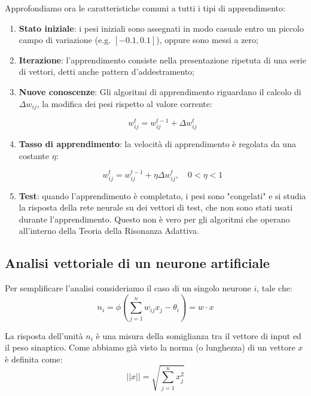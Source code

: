 Approfondiamo ora le caratteristiche comuni a tutti i tipi di apprendimento:
\begin{enumerate}
	\item \textbf{Stato iniziale}: i pesi iniziali sono assegnati in modo
	      casuale entro un piccolo campo di variazione (e.g. $[-0.1, 0.1]$),
	      oppure sono messi a zero;

	\item \textbf{Iterazione}: l'apprendimento consiste nella presentazione
	      ripetuta di una serie di vettori, detti anche pattern d'addestramento;

	\item \textbf{Nuove conoscenze}: Gli algoritmi di apprendimento
	      riguardano il calcolo di $\Delta w_{ij}$, la modifica dei pesi
	      rispetto al valore corrente:

	      \begin{equation*}
		      w_{ij}^t = w_{ij}^{t-1} + \Delta w_{ij}^{t}
	      \end{equation*}

	\item \textbf{Tasso di apprendimento}: la velocità di apprendimento è
	      regolata da una costante $\eta$:

	      \begin{equation*}
		      w_{ij}^t = w_{ij}^{t-1} + \eta \Delta w_{ij}^{t}, \quad 0 < \eta < 1
	      \end{equation*}

	\item \textbf{Test}: quando l'apprendimento è completato, i pesi sono
	      "congelati" e si studia la risposta della rete neurale su dei vettori
	      di test, che non sono stati usati durante l'apprendimento. Questo non
	      è vero per gli algoritmi che operano all'interno della Teoria della
	      Risonanza Adattiva.
\end{enumerate}

\subsection{Analisi vettoriale di un neurone artificiale}

Per semplificare l'analisi consideriamo il caso di un singolo neurone $i$, tale
che:
\begin{equation*}
	n_i = \phi(\sum_{j=1}^{n} w_{ij}x_j - \theta_i) = w \cdot x
\end{equation*}

La risposta dell'unità $n_i$ è una misura della somiglianza tra il vettore di
input ed il peso sinaptico. Come abbiamo già visto la norma (o lunghezza) di un
vettore $x$ è definita come:
\begin{equation*}
	||x|| = \sqrt{\sum_{j=1}^{n} x_j^2}
\end{equation*}

